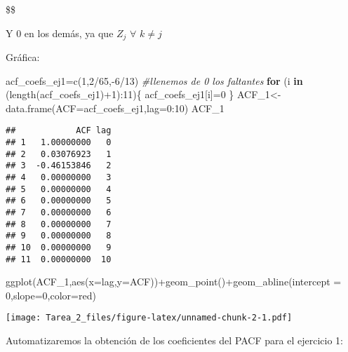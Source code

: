 \documentclass[
]{article}
\newenvironment{Shaded}{\begin{snugshade}}{\end{snugshade}}
\newcommand{\AttributeTok}[1]{\textcolor[rgb]{0.77,0.63,0.00}{#1}}
\newcommand{\CommentTok}[1]{\textcolor[rgb]{0.56,0.35,0.01}{\textit{#1}}}
\newcommand{\ControlFlowTok}[1]{\textcolor[rgb]{0.13,0.29,0.53}{\textbf{#1}}}
\newcommand{\DecValTok}[1]{\textcolor[rgb]{0.00,0.00,0.81}{#1}}
\newcommand{\FunctionTok}[1]{\textcolor[rgb]{0.00,0.00,0.00}{#1}}
\newcommand{\NormalTok}[1]{#1}
\newcommand{\OtherTok}[1]{\textcolor[rgb]{0.56,0.35,0.01}{#1}}
\newcommand{\SpecialCharTok}[1]{\textcolor[rgb]{0.00,0.00,0.00}{#1}}
\newcommand{\StringTok}[1]{\textcolor[rgb]{0.31,0.60,0.02}{#1}}
\begin{document}
\$\$

Y 0 en los demás, ya que \(Z_{j}\) \(\forall\) \(k \ne j\)

Gráfica:

\begin{Shaded}
\begin{Highlighting}[]
\NormalTok{acf\_coefs\_ej1}\OtherTok{=}\FunctionTok{c}\NormalTok{(}\DecValTok{1}\NormalTok{,}\DecValTok{2}\SpecialCharTok{/}\DecValTok{65}\NormalTok{,}\SpecialCharTok{{-}}\DecValTok{6}\SpecialCharTok{/}\DecValTok{13}\NormalTok{)}
\CommentTok{\#llenemos de 0 los faltantes}
\ControlFlowTok{for}\NormalTok{ (i }\ControlFlowTok{in}\NormalTok{ (}\FunctionTok{length}\NormalTok{(acf\_coefs\_ej1)}\SpecialCharTok{+}\DecValTok{1}\NormalTok{)}\SpecialCharTok{:}\DecValTok{11}\NormalTok{)\{}
\NormalTok{  acf\_coefs\_ej1[i]}\OtherTok{=}\DecValTok{0}
\NormalTok{\}}
\NormalTok{ACF\_1}\OtherTok{\textless{}{-}}\FunctionTok{data.frame}\NormalTok{(}\StringTok{\textquotesingle{}ACF\textquotesingle{}}\OtherTok{=}\NormalTok{acf\_coefs\_ej1,}\AttributeTok{lag=}\DecValTok{0}\SpecialCharTok{:}\DecValTok{10}\NormalTok{)}
\NormalTok{ACF\_1}
\end{Highlighting}
\end{Shaded}

\begin{verbatim}
##            ACF lag
## 1   1.00000000   0
## 2   0.03076923   1
## 3  -0.46153846   2
## 4   0.00000000   3
## 5   0.00000000   4
## 6   0.00000000   5
## 7   0.00000000   6
## 8   0.00000000   7
## 9   0.00000000   8
## 10  0.00000000   9
## 11  0.00000000  10
\end{verbatim}

\begin{Shaded}
\begin{Highlighting}[]
\FunctionTok{ggplot}\NormalTok{(ACF\_1,}\FunctionTok{aes}\NormalTok{(}\AttributeTok{x=}\NormalTok{lag,}\AttributeTok{y=}\NormalTok{ACF))}\SpecialCharTok{+}\FunctionTok{geom\_point}\NormalTok{()}\SpecialCharTok{+}\FunctionTok{geom\_abline}\NormalTok{(}\AttributeTok{intercept =} \DecValTok{0}\NormalTok{,}\AttributeTok{slope=}\DecValTok{0}\NormalTok{,}\AttributeTok{color=}\StringTok{\textquotesingle{}red\textquotesingle{}}\NormalTok{)}
\end{Highlighting}
\end{Shaded}

\texttt{[image: Tarea\_2\_files/figure-latex/unnamed-chunk-2-1.pdf]}

Automatizaremos la obtención de los coeficientes del PACF para el
ejercicio 1:
\end{document}
